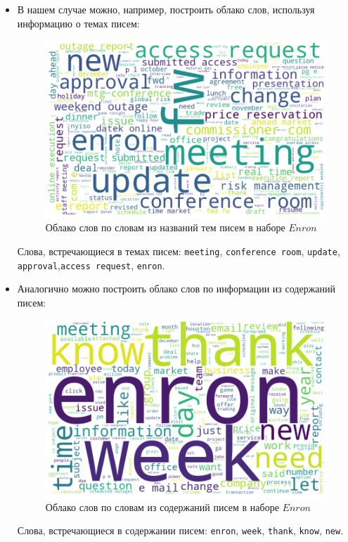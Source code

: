 \begin{itemize}
\item В нашем случае можно, например, построить облако слов, используя информацию о темах писем:

\begin{figure}[H]
\centering
\includegraphics[scale=0.6]{pics/enron_wordcloud_subject.png}
\caption{Облако слов по словам из названий тем писем в наборе $Enron$}
\end{figure}



Слова, встречающиеся в темах писем: \texttt{meeting}, \texttt{conference room}, \texttt{update}, \texttt{approval},\texttt{access request}, \texttt{enron}.

\item Аналогично можно построить облако слов по информации из содержаний писем:

\begin{figure}[H]
\centering
\includegraphics[scale=0.6]{pics/enron_wordcloud_content.png}
\caption{Облако слов по словам из содержаний писем в наборе $Enron$}
\end{figure}


Слова, встречающиеся в содержании писем: \texttt{enron}, \texttt{week}, \texttt{thank}, \texttt{know}, \texttt{new}.

\end{itemize}

